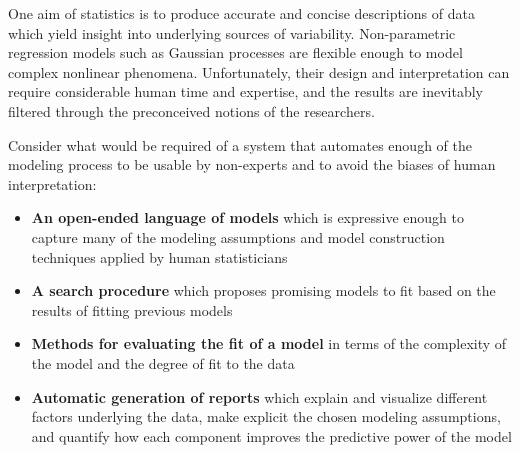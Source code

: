\documentclass[letterpaper]{article}
\def\eg{e.g.\ }
\begin{document}
One aim of statistics is to produce accurate and concise descriptions of data which yield insight into underlying sources of variability.
Non-parametric regression models such as Gaussian processes are flexible enough to model complex nonlinear phenomena. Unfortunately, their design and interpretation can require considerable human time and expertise, and the results are inevitably filtered through the preconceived notions of the researchers.


Consider what would be required of a system that automates enough of the modeling process to be usable by non-experts and to avoid the biases of human interpretation:
\begin{itemize}
\item {\bf An open-ended language of models} which is expressive enough to capture many of the modeling assumptions and model construction techniques applied by human statisticians
\item {\bf A search procedure} which proposes promising models to fit based on the results of fitting previous models
\item {\bf Methods for evaluating the fit of a model} in terms of the complexity of the model and the degree of fit to the data
\item {\bf Automatic generation of reports} which explain and visualize different factors underlying the data, make explicit the chosen modeling assumptions, and quantify how each component improves the predictive power of the model
\end{itemize}
\end{document}
